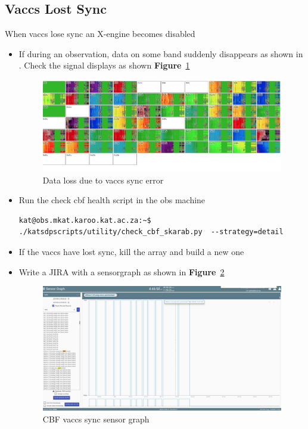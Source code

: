 \subsection{ Vaccs Lost Sync}
When vaccs lose sync an X-engine becomes disabled
\begin{itemize}

	\item{} If during an observation, data on some band suddenly disappears as shown in . Check the signal displays as shown \textbf{Figure}~\ref{fig:image24}
	\begin{figure}[!thb]
		\centering
		\includegraphics[scale=0.26]{Chapters/images/image24.png}
		
		\caption{Data loss due to vaccs sync error}
		\label{fig:image24}
	\end{figure}

\item{} Run the check cbf health script in the obs machine
\begin{lstlisting}[style=DOS]
kat@obs.mkat.karoo.kat.ac.za:~$ ./katsdpscripts/utility/check_cbf_skarab.py  --strategy=detail
\end{lstlisting}

\item{} If the vaccs have lost sync, kill the array and build a new one
\item{} Write a JIRA with a sensorgraph as shown in \textbf{Figure}~\ref{fig:image27}



\begin{figure}[!thb]
	\centering
	\includegraphics[scale=0.26]{Chapters/images/image27.png}
	
	\caption{CBF vaccs sync sensor graph}
	\label{fig:image27}
\end{figure}

\end{itemize}
